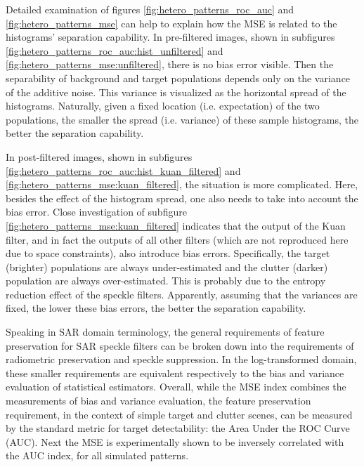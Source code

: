 Detailed examination of figures \ref{fig:hetero_patterns_roc_auc} and \ref{fig:hetero_patterns_mse} 
	can help to explain how the MSE is related to the histograms' separation capability.
In pre-filtered images, shown in subfigures \ref{fig:hetero_patterns_roc_auc:hist_unfiltered} and 
\ref{fig:hetero_patterns_mse:unfiltered}, there is no bias error visible.
Then the separability of background and target populations depends only on the variance of the additive noise. 
This variance is visualized as the horizontal spread of the histograms.
Naturally, given a fixed location (i.e. expectation) of the two populations, the smaller the spread (i.e. variance) of these sample histograms, 
the better the separation capability.

In post-filtered images, shown in subfigures \ref{fig:hetero_patterns_roc_auc:hist_kuan_filtered} and 
\ref{fig:hetero_patterns_mse:kuan_filtered}, the situation is more complicated.
Here, besides the effect of the histogram spread, one also needs to take into account the bias error.
Close investigation of subfigure \ref{fig:hetero_patterns_mse:kuan_filtered} indicates that the output of the 
Kuan filter, and in fact the outputs of all other filters (which are not reproduced here due to space constraints), 
also introduce bias errors.
Specifically, the target (brighter) populations are always under-estimated and the clutter (darker) population are 
always over-estimated. This is probably due to the entropy reduction effect of the speckle filters.
Apparently, assuming that the variances are fixed, the lower these bias errors, the better the separation capability.

Speaking in SAR domain terminology, the general requirements of feature preservation for SAR speckle filters can be broken 
down into the requirements of radiometric preservation and speckle suppression.
In the log-transformed domain, these smaller requirements are equivalent respectively to the bias and variance evaluation of 
statistical estimators.
Overall, while the MSE index combines the measurements of bias and variance evaluation, 
	the feature preservation requirement, in the context of simple target and clutter scenes, can be measured by 
	the standard metric for target detectability: the Area Under the ROC Curve (AUC).
Next the MSE is experimentally shown to be inversely correlated with the AUC index, for all simulated patterns.


